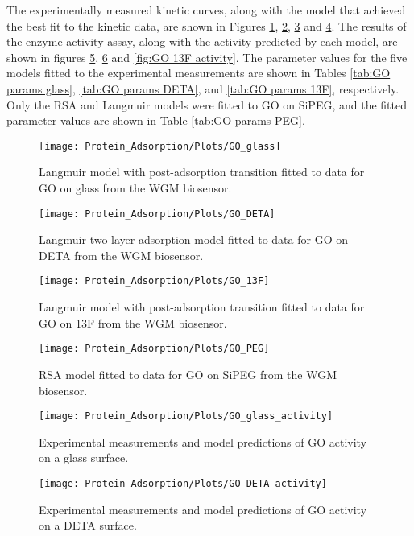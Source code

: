 The experimentally measured kinetic curves, along with the model that
achieved the best fit to the kinetic data, are shown in Figures \ref{fig:GO glass plot},
\ref{fig:GO on DETA}, \ref{fig:GO on 13F} and \ref{fig:GO on PEG}.
The results of the enzyme activity assay, along with the activity
predicted by each model, are shown in figures \ref{fig:GO glass activity},
\ref{fig:GO DETA activity} and \ref{fig:GO 13F activity}. The parameter
values for the five models fitted to the experimental measurements
are shown in Tables \ref{tab:GO params glass}, \ref{tab:GO params DETA},
and \ref{tab:GO params 13F}, respectively. Only the RSA and Langmuir
models were fitted to GO on SiPEG, and the fitted parameter values
are shown in Table \ref{tab:GO params PEG}. %
\begin{figure}
\texttt{[image: Protein\_Adsorption/Plots/GO\_glass]}\caption{\label{fig:GO glass plot}Langmuir model with post-adsorption transition
fitted to data for GO on glass from the WGM biosensor.}
%
\end{figure}
%
\begin{figure}
\texttt{[image: Protein\_Adsorption/Plots/GO\_DETA]}

\caption{\label{fig:GO on DETA}Langmuir two-layer adsorption model fitted
to data for GO on DETA from the WGM biosensor.}
%
\end{figure}
%
\begin{figure}
\texttt{[image: Protein\_Adsorption/Plots/GO\_13F]}

\caption{\label{fig:GO on 13F}Langmuir model with post-adsorption transition
fitted to data for GO on 13F from the WGM biosensor.}
%
\end{figure}
%
\begin{figure}
\texttt{[image: Protein\_Adsorption/Plots/GO\_PEG]}

\caption{\label{fig:GO on PEG}RSA model fitted to data for GO on SiPEG from
the WGM biosensor.}
%
\end{figure}
%
\begin{figure}
\texttt{[image: Protein\_Adsorption/Plots/GO\_glass\_activity]}

\caption{\label{fig:GO glass activity}Experimental measurements and model
predictions of GO activity on a glass surface.}


%
\end{figure}
%
\begin{figure}
\texttt{[image: Protein\_Adsorption/Plots/GO\_DETA\_activity]}

\caption{\label{fig:GO DETA activity}Experimental measurements and model predictions
of GO activity on a DETA surface.}
%
\end{figure}
